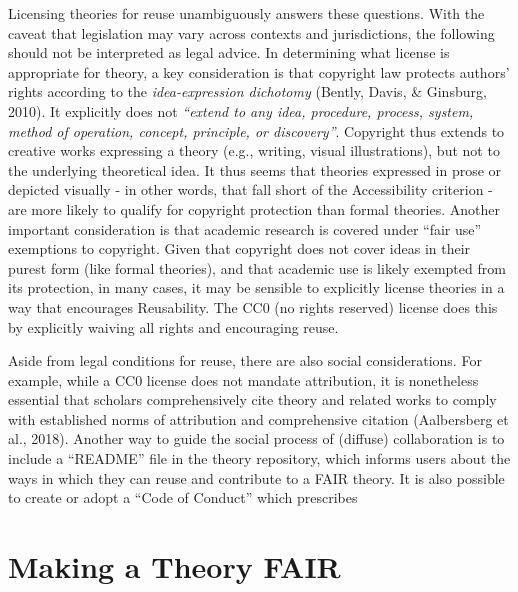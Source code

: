 \documentclass[
  man,floatsintext]{apa6}
\begin{document}
Licensing theories for reuse unambiguously answers these questions.
With the caveat that legislation may vary across contexts and jurisdictions, the following should not be interpreted as legal advice.
In determining what license is appropriate for theory,
a key consideration is that copyright law protects authors' rights according to the \emph{idea-expression dichotomy} (Bently, Davis, \& Ginsburg, 2010).
It explicitly does not
\emph{``extend to any idea, procedure, process, system, method of operation, concept, principle, or discovery''}.
Copyright thus extends to creative works expressing a theory (e.g., writing, visual illustrations),
but not to the underlying theoretical idea.
It thus seems that theories expressed in prose or depicted visually - in other words, that fall short of the Accessibility criterion - are more likely to qualify for copyright protection than formal theories.
Another important consideration is that academic research is covered under ``fair use'' exemptions to copyright.
Given that copyright does not cover ideas in their purest form (like formal theories), and that academic use is likely exempted from its protection,
in many cases, it may be sensible to explicitly license theories in a way that encourages Reusability.
The CC0 (no rights reserved) license does this by explicitly waiving all rights and encouraging reuse.

Aside from legal conditions for reuse, there are also social considerations.
For example, while a CC0 license does not mandate attribution,
it is nonetheless essential that scholars comprehensively cite theory and related works to comply with established norms of attribution and comprehensive citation (Aalbersberg et al., 2018).
Another way to guide the social process of (diffuse) collaboration is to include a ``README'' file in the theory repository, which informs users about the ways in which they can reuse and contribute to a FAIR theory.
It is also possible to create or adopt a ``Code of Conduct'' which prescribes

\section{Making a Theory FAIR}\label{making-a-theory-fair}
\end{document}
